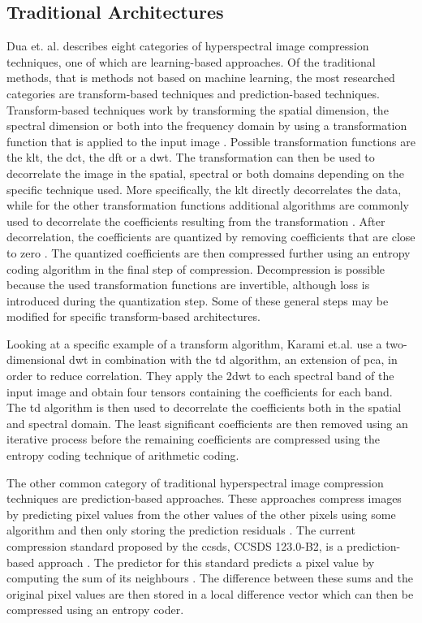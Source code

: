 \subsection{Traditional Architectures}
Dua et. al. \citep{dua_comprehensive_2020} describes eight categories of hyperspectral image compression techniques, one of which are learning-based approaches. Of the traditional methods, that is methods not based on machine learning, the most researched categories are transform-based techniques and prediction-based techniques. Transform-based techniques work by transforming the spatial dimension, the spectral dimension or both into the frequency domain by using a transformation function that is applied to the input image \citep{dua_comprehensive_2020}. Possible transformation functions are the \ac{klt}, the \ac{dct}, the \ac{dft} or a \ac{dwt}. The transformation can then be used to decorrelate the image in the spatial, spectral or both domains depending on the specific technique used. More specifically, the \ac{klt} directly decorrelates the data, while for the other transformation functions additional algorithms are commonly used to decorrelate the coefficients resulting from the transformation \citep{saghri_adaptive_2010,karami_compression_2012}. After decorrelation, the coefficients are quantized by removing coefficients that are close to zero \citep{dua_comprehensive_2020}. The quantized coefficients are then compressed further using an entropy coding algorithm in the final step of compression. Decompression is possible because the used transformation functions are invertible, although loss is introduced during the quantization step. Some of these general steps may be modified for specific transform-based architectures.

Looking at a specific example of a transform algorithm, Karami et.al. \citep{karami_compression_2012} use a two-dimensional \ac{dwt} in combination with the \ac{td} algorithm, an extension of \ac{pca}, in order to reduce correlation. They apply the 2\ac{dwt} to each spectral band of the input image and obtain four tensors containing the coefficients for each band. The \ac{td} algorithm is then used to decorrelate the coefficients both in the spatial and spectral domain. The least significant coefficients are then removed using an iterative process before the remaining coefficients are compressed using the entropy coding technique of arithmetic coding.

The other common category of traditional hyperspectral image compression techniques are prediction-based approaches. These approaches compress images by predicting pixel values from the other values of the other pixels using some algorithm and then only storing the prediction residuals \citep{dua_comprehensive_2020,conoscenti_constant_2016}. The current compression standard proposed by the \ac{ccsds}, CCSDS 123.0-B2, is a prediction-based approach \citep{hernandez-cabronero_ccsds_2021}. The predictor for this standard predicts a pixel value by computing the sum of its neighbours \citep{conoscenti_constant_2016}. The difference between these sums and the original pixel values are then stored in a local difference vector which can then be compressed using an entropy coder.
